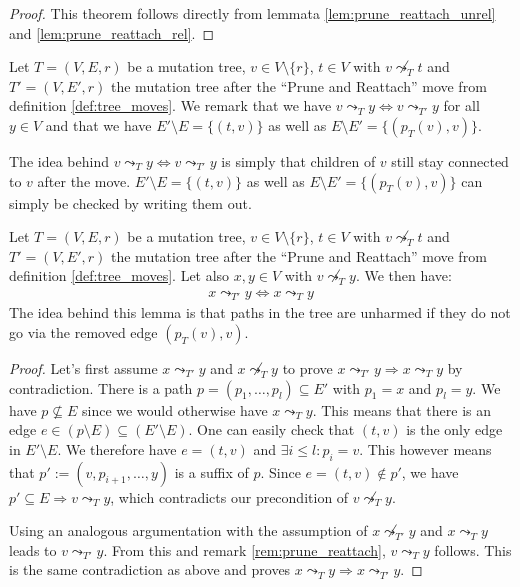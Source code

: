 \begin{proof}
    This theorem follows directly from lemmata \ref{lem:prune_reattach_unrel} and \ref{lem:prune_reattach_rel}.
\end{proof}

\begin{remark}
    \label{rem:prune_reattach}
    Let $T = (V, E, r)$ be a mutation tree, $v \in V \setminus \{r\}$, $t \in V$ with $v \not\leadsto_T t$ and $T' = (V, E', r)$ the mutation tree after the ``Prune and Reattach'' move from definition \ref{def:tree_moves}. We remark that we have $v \leadsto_T y \Leftrightarrow v \leadsto_{T'} y$ for all $y \in V$ and that we have $E' \setminus E = \{(t,v)\}$ as well as $E \setminus E' = \{(p_T(v), v)\}$.
\end{remark}

The idea behind $v \leadsto_T y \Leftrightarrow v \leadsto_{T'} y$ is simply that children of $v$ still stay connected to $v$ after the move. $E' \setminus E = \{(t,v)\}$ as well as $E \setminus E' = \{(p_T(v), v)\}$ can simply be checked by writing them out.

\begin{lemma}
    \label{lem:prune_reattach_unrel}
    Let $T = (V, E, r)$ be a mutation tree, $v \in V \setminus \{r\}$, $t \in V$ with $v \not\leadsto_T t$ and $T' = (V, E', r)$ the mutation tree after the ``Prune and Reattach'' move from definition \ref{def:tree_moves}. Let also $x, y \in V$ with $v \not\leadsto_T y$. We then have:
    \begin{align*}
        x \leadsto_{T'} y \Leftrightarrow x \leadsto_T y
    \end{align*}
    The idea behind this lemma is that paths in the tree are unharmed if they do not go via the removed edge $(p_T(v), v)$.
\end{lemma}

\begin{proof}
    Let's first assume $x \leadsto_{T'} y$ and $x \not\leadsto_{T} y$ to prove $x \leadsto_{T'} y \Rightarrow x \leadsto_T y$ by contradiction. There is a path $p = (p_1, \dots, p_l) \subseteq E'$ with $p_1 = x$ and $p_l = y$. We have $p \not\subseteq E$ since we would otherwise have $x \leadsto_T y$. This means that there is an edge $e \in (p \setminus E) \subseteq (E' \setminus E)$. One can easily check that $(t, v)$ is the only edge in $E' \setminus E$. We therefore have $e = (t, v)$ and $\exists i \leq l: p_i = v$. This however means that $p' := (v, p_{i+1}, \dots, y)$ is a suffix of $p$. Since $e = (t,v) \notin p'$, we have $p' \subseteq E \Rightarrow v \leadsto_{T} y$, which contradicts our precondition of $v \not\leadsto_T y$.

    Using an analogous argumentation with the assumption of $x \not\leadsto_{T'} y$ and $x \leadsto_T y$ leads to $v \leadsto_{T'} y$. From this and remark \ref{rem:prune_reattach}, $v \leadsto_T y$ follows. This is the same contradiction as above and proves $x \leadsto_T y \Rightarrow x \leadsto_{T'} y$.
\end{proof}

